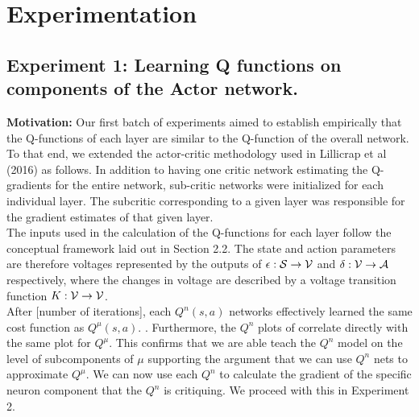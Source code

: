 \section{Experimentation}
\subsection{Experiment 1: Learning Q functions on components of the Actor network.}
\textbf{Motivation:} 
Our first batch of experiments aimed to establish empirically that the Q-functions of each layer are similar to the Q-function of the overall network. To that end, we extended the actor-critic methodology used in Lillicrap et al (2016) as follows. In addition to  having one critic network estimating the Q-gradients for the entire network, sub-critic networks were initialized for each individual layer. The subcritic corresponding to a given layer was responsible for the gradient estimates of that given layer. \\
\newline
The inputs used in the calculation of the Q-functions for each layer follow the conceptual framework laid out in Section 2.2. The state and action parameters are therefore voltages represented by the outputs of $\epsilon : {\mathcal S} \to {\mathcal V}$ and $\delta : {\mathcal V} \to {\mathcal A}$ respectively, where the changes in voltage are described by a voltage transition function $K : {\mathcal V} \to {\mathcal V}$. \\
\newline
After [number of iterations], each $Q^n(s,a)$  networks effectively learned the same cost function as $Q^{\mu}(s,a)$.
. Furthermore, the $Q^n$ plots of  correlate directly with the same plot for $Q^{\mu}$. This confirms that we are able teach the $Q^n$ model on the level of subcomponents of $\mu$ supporting the argument that we can use $Q^n$ nets to approximate $Q^\mu$. We can now use each $Q^n$ to calculate the gradient of the specific neuron component that the $Q^n$ is critiquing. We proceed with this in Experiment 2.
